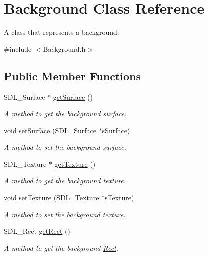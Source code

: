 \hypertarget{class_background}{\section{Background Class Reference}
\label{class_background}
}


A class that represents a background.  




{\ttfamily \#include $<$Background.\+h$>$}

\subsection*{Public Member Functions}
\begin{DoxyCompactItemize}
\item 
S\+D\+L\+\_\+\+Surface $\ast$ \hyperlink{class_background_ab0b25086c8d80f30ba80949ae9b81af6}{get\+Surface} ()
\begin{DoxyCompactList}\small\item\em A method to get the background surface. \end{DoxyCompactList}\item 
void \hyperlink{class_background_a0ba0f788a998021c2e93ceca3fe427e7}{set\+Surface} (S\+D\+L\+\_\+\+Surface $\ast$s\+Surface)
\begin{DoxyCompactList}\small\item\em A method to set the background surface. \end{DoxyCompactList}\item 
S\+D\+L\+\_\+\+Texture $\ast$ \hyperlink{class_background_ae335b7a3476558ac7231963e9a71c6f0}{get\+Texture} ()
\begin{DoxyCompactList}\small\item\em A method to get the background texture. \end{DoxyCompactList}\item 
void \hyperlink{class_background_a02480d048c8a5e7a915063ade9de9e8b}{set\+Texture} (S\+D\+L\+\_\+\+Texture $\ast$s\+Texture)
\begin{DoxyCompactList}\small\item\em A method to set the background texture. \end{DoxyCompactList}\item 
S\+D\+L\+\_\+\+Rect \hyperlink{class_background_a3005aceaae7861318581994a4961c99d}{get\+Rect} ()
\begin{DoxyCompactList}\small\item\em A method to get the background \hyperlink{struct_rect}{Rect}. \end{DoxyCompactList}\end{DoxyCompactItemize}



